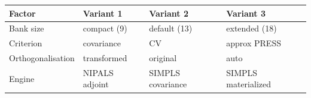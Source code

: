 \begin{tabular}{llll}
\toprule
Factor & Variant 1 & Variant 2 & Variant 3 \\
\midrule
Bank size & compact (9) & default (13) & extended (18) \\
Criterion & covariance & CV & approx PRESS \\
Orthogonalisation & transformed & original & auto \\
Engine & NIPALS adjoint & SIMPLS covariance & SIMPLS materialized \\
\bottomrule
\end{tabular}


